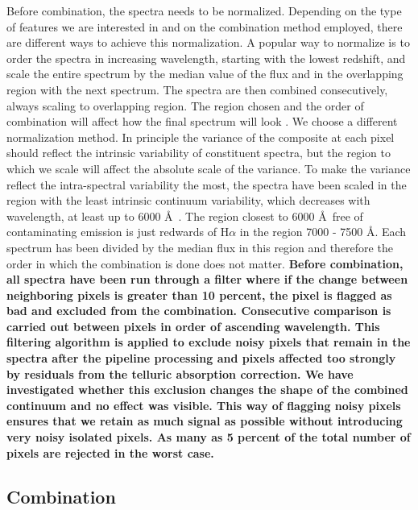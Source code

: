 \documentclass{aa}    %
\newcommand{\sectlabel}[1]{\label{sect:#1}}
\begin{document}
Before combination, the spectra needs to be normalized. Depending on the type of features we are interested in and
on the combination method employed, there are different ways to
achieve this normalization. A popular way to normalize is to order the
spectra in increasing wavelength, starting with the lowest redshift,
and scale the entire spectrum by the median value of the flux and in
the overlapping region with the next spectrum. The spectra are then
combined consecutively, always scaling to overlapping region. The
region chosen and the order of combination will affect how the final
spectrum will look
\citep{Francis1991,Brotherton2000,VandenBerk2001,Glikman2006}. We
choose a different normalization method. In principle the variance of
the composite at each pixel should reflect the intrinsic variability of constituent
spectra, but the region to which we scale will affect the absolute
scale of the variance. To make the variance reflect the intra-spectral
variability the most, the spectra have been scaled in the region with
the least intrinsic continuum variability, which decreases with
wavelength, at least up to 6000 \AA~\citep{VandenBerk2004}. The
region closest to 6000 \AA~free of contaminating emission is just
redwards of H$\alpha$ in the region 7000 - 7500 \AA. Each spectrum has
been divided by the median flux in this region and therefore the order in which the combination is done does not
matter. \textbf{Before combination, all spectra have been run
through a filter where if the change between neighboring pixels is greater
than 10 percent, the pixel is flagged as bad and excluded from the
combination. Consecutive comparison is carried out between pixels in order of ascending wavelength. This filtering algorithm is applied to exclude noisy pixels that remain in the spectra after the pipeline processing and pixels affected too
strongly by residuals from the telluric absorption correction. We have investigated
whether this exclusion changes the shape of the combined continuum and
no effect was visible. This way of flagging noisy pixels ensures that
we retain as much signal as possible without introducing very noisy
isolated pixels. As many as 5 percent of the total number of pixels are
rejected in the worst case.}


\subsection{Combination}  \sectlabel{combine}
\end{document}
